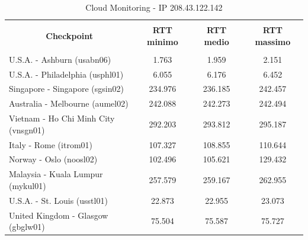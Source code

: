 \documentclass[a4paper,11pt]{book}
\begin{document}
\begin{table}[!ht]
\caption{Cloud Monitoring - IP 208.43.122.142}\label{table:Monitoring_4}
\begin{tabular}{|l|c|c|c|}
\hline
\multicolumn{1}{|c|}{\textbf{}} & {\textbf{}} & {\textbf{}} & {\textbf{}}\\
\multicolumn{1}{|c|}{\textbf{Checkpoint}} & {\textbf{RTT minimo}} & {\textbf{RTT medio}} & {\textbf{RTT massimo}}\\
\multicolumn{1}{|c|}{\textbf{}} & {\textbf{}} & {\textbf{}} & {\textbf{}}\\
\hline
U.S.A. - Ashburn (usabn06) & 1.763 & 1.959 & 2.151\\
U.S.A. - Philadelphia (usphl01) & 6.055 & 6.176 & 6.452\\
Singapore - Singapore (sgsin02) & 234.976 & 236.185 & 242.457\\
Australia - Melbourne (aumel02) & 242.088 & 242.273 & 242.494\\
Vietnam - Ho Chi Minh City (vnsgn01) & 	292.203 & 293.812 & 295.187\\
Italy - Rome (itrom01) & 107.327 & 108.855 & 110.644\\
Norway - Oslo (noosl02) & 102.496 & 105.621 & 129.432\\
Malaysia - Kuala Lumpur (mykul01) & 257.579 & 259.167 & 262.955\\
U.S.A. - St. Louis (usstl01) & 22.873 & 22.955 & 23.073\\
United Kingdom - Glasgow (gbglw01) & 75.504 & 75.587 & 75.727\\
\hline
\end{tabular}
\end{table}

~ 
\end{document}
